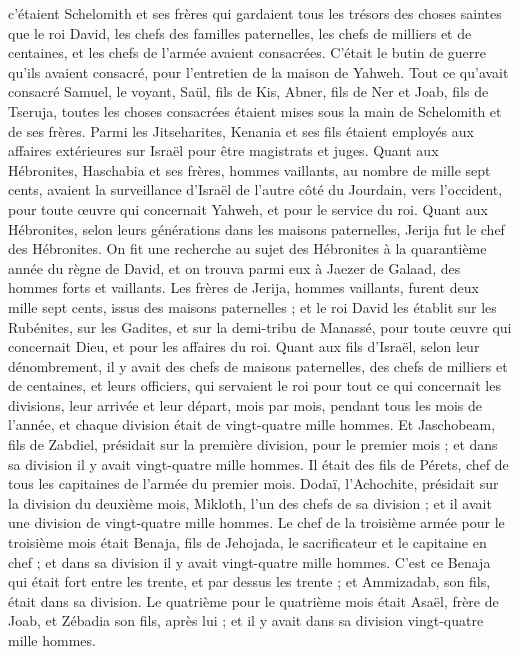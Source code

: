 \begin{multicols}{2}
c’étaient Schelomith et ses frères qui gardaient tous les trésors des choses saintes que le roi David, les chefs des familles paternelles, les chefs de milliers et de centaines, et les chefs de l'armée avaient consacrées.
C'était le butin de guerre qu'ils avaient consacré, pour l’entretien de la maison de Yahweh.
Tout ce qu'avait consacré Samuel, le voyant, Saül, fils de Kis, Abner, fils de Ner et Joab, fils de Tseruja, toutes les choses consacrées étaient mises sous la main de Schelomith et de ses frères.
Parmi les Jitseharites, Kenania et ses fils étaient employés aux affaires extérieures sur Israël pour être magistrats et juges.
Quant aux Hébronites, Haschabia et ses frères, hommes vaillants, au nombre de mille sept cents, avaient la surveillance d'Israël de l’autre côté du Jourdain, vers l'occident, pour toute œuvre qui concernait Yahweh, et pour le service du roi.
Quant aux Hébronites, selon leurs générations dans les maisons paternelles, Jerija fut le chef des Hébronites. On fit une recherche au sujet des Hébronites à la quarantième année du règne de David, et on trouva parmi eux à Jaezer de Galaad, des hommes forts et vaillants.
Les frères de Jerija, hommes vaillants, furent deux mille sept cents, issus des maisons paternelles ; et le roi David les établit sur les Rubénites, sur les Gadites, et sur la demi-tribu de Manassé, pour toute œuvre qui concernait Dieu, et pour les affaires du roi.
\VerseOne{}Quant aux fils d'Israël, selon leur dénombrement, il y avait des chefs de maisons paternelles, des chefs de milliers et de centaines, et leurs officiers, qui servaient le roi pour tout ce qui concernait les divisions, leur arrivée et leur départ, mois par mois, pendant tous les mois de l'année, et chaque division était de vingt-quatre mille hommes.
Et Jaschobeam, fils de Zabdiel, présidait sur la première division, pour le premier mois ; et dans sa division il y avait vingt-quatre mille hommes.
Il était des fils de Pérets, chef de tous les capitaines de l'armée du premier mois.
Dodaï, l'Achochite, présidait sur la division du deuxième mois, Mikloth, l’un des chefs de sa division ; et il avait une division de vingt-quatre mille hommes.
Le chef de la troisième armée pour le troisième mois était Benaja, fils de Jehojada, le sacrificateur et le capitaine en chef ; et dans sa division il y avait vingt-quatre mille hommes.
C'est ce Benaja qui était fort entre les trente, et par dessus les trente ; et Ammizadab, son fils, était dans sa division.
Le quatrième pour le quatrième mois était Asaël, frère de Joab, et Zébadia son fils, après lui ; et il y avait dans sa division vingt-quatre mille hommes.

\end{multicols}
